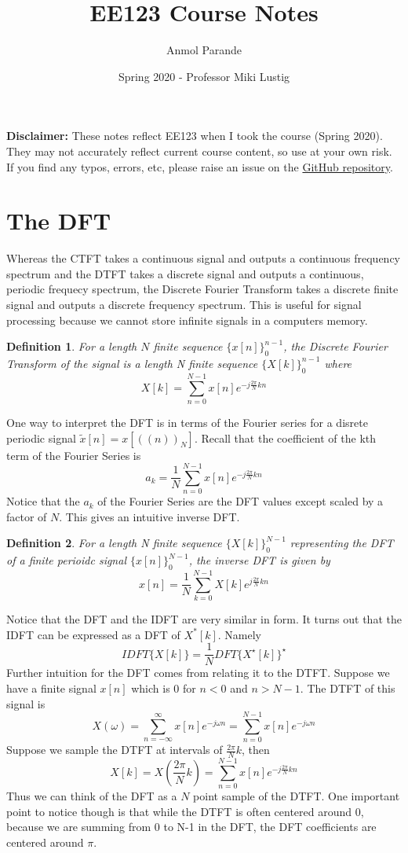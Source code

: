 \documentclass{article}
\newtheorem{definition}{Definition}
\begin{document}
\title{EE123 Course Notes}
\author{Anmol Parande}
\date{Spring 2020 - Professor Miki Lustig}
\maketitle
\textbf{Disclaimer: }These notes reflect EE123 when I took the course (Spring 2020). They may not accurately reflect current course content, so use at your own risk.
If you find any typos, errors, etc, please raise an issue on the \href{https://github.com/parandea17/BerkeleyNotes}{GitHub repository}.\\
\tableofcontents
\newpage
\section{The DFT}
Whereas the CTFT takes a continuous signal and outputs a continuous frequency spectrum and the DTFT takes a discrete signal
and outputs a continuous, periodic frequecy spectrum, the Discrete Fourier Transform takes a discrete finite signal and outputs
a discrete frequency spectrum. This is useful for signal processing because we cannot store infinite signals in a computers memory.
\begin{definition}
    For a length $N$ finite sequence $\{x[n]\}^{n-1}_{0}$, the Discrete Fourier Transform of the signal
    is a length N finite sequence $\{X[k]\}^{n-1}_{0}$ where
    $$X[k] = \sum_{n=0}^{N-1}{x[n]e^{-j\frac{2\pi}{N}kn}}$$
\end{definition}
One way to interpret the DFT is in terms of the Fourier series for a disrete periodic signal $\tilde{x}[n]=x[((n))_N]$. Recall that the coefficient of the kth term of the Fourier Series is
$$a_k = \frac{1}{N}\sum_{n=0}^{N-1}{x[n]e^{-j\frac{2\pi}{N}kn}}$$
Notice that the $a_k$ of the Fourier Series are the DFT values except scaled by a factor of $N$. This gives an intuitive inverse DFT.
\begin{definition}
    For a length N finite sequence $\{X[k]\}^{N-1}_{0}$ representing the DFT of a finite perioidc signal $\{x[n]\}^{N-1}_{0}$,
    the inverse DFT is given by
    $$x[n] = \frac{1}{N}\sum_{k=0}^{N-1}{X[k]e^{j\frac{2\pi}{N}kn}}$$
\end{definition}
Notice that the DFT and the IDFT are very similar in form. It turns out that the IDFT can be expressed as a DFT of $X^*[k]$. Namely
$$IDFT\{X[k]\} = \frac{1}{N}DFT\{X^\star[k]\}^\star$$
Further intuition for the DFT comes from relating it to the DTFT. Suppose we have a finite signal $x[n]$ which is $0$ for $n < 0$ and $n > N-1$.
The DTFT of this signal is
$$X(\omega) = \sum_{n=-\infty}^{\infty}{x[n]e^{-j\omega n}} = \sum_{n=0}^{N-1}{x[n]e^{-j\omega n}}$$
Suppose we sample the DTFT at intervals of $\frac{2\pi}{N}k$, then
$$X[k] = X\left(\frac{2\pi}{N}k\right) = \sum_{n=0}^{N-1}{x[n]e^{-j\frac{2\pi}{N}k n}}$$
Thus we can think of the DFT as a $N$ point sample of the DTFT.
One important point to notice though is that while the DTFT is often centered around 0, because we are summing
from 0 to N-1 in the DFT, the DFT coefficients are centered around $\pi$.
\end{document}
